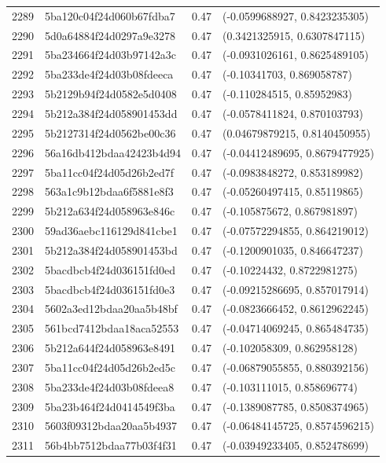 \begin{table}[ht]
\begin{tabular}{rlrl}
  2289 & 5ba120c04f24d060b67fdba7 & 0.47 & (-0.0599688927, 0.8423235305) \\ 
  2290 & 5d0a64884f24d0297a9e3278 & 0.47 & (0.3421325915, 0.6307847115) \\ 
  2291 & 5ba234664f24d03b97142a3c & 0.47 & (-0.0931026161, 0.8625489105) \\ 
  2292 & 5ba233de4f24d03b08fdeeca & 0.47 & (-0.10341703, 0.869058787) \\ 
  2293 & 5b2129b94f24d0582e5d0408 & 0.47 & (-0.110284515, 0.85952983) \\ 
  2294 & 5b212a384f24d058901453dd & 0.47 & (-0.0578411824, 0.870103793) \\ 
  2295 & 5b2127314f24d0562be00c36 & 0.47 & (0.04679879215, 0.8140450955) \\ 
  2296 & 56a16db412bdaa42423b4d94 & 0.47 & (-0.04412489695, 0.8679477925) \\ 
  2297 & 5ba11cc04f24d05d26b2ed7f & 0.47 & (-0.0983848272, 0.853189982) \\ 
  2298 & 563a1c9b12bdaa6f5881e8f3 & 0.47 & (-0.05260497415, 0.85119865) \\ 
  2299 & 5b212a634f24d058963e846c & 0.47 & (-0.105875672, 0.867981897) \\ 
  2300 & 59ad36aebc116129d841cbe1 & 0.47 & (-0.07572294855, 0.864219012) \\ 
  2301 & 5b212a384f24d058901453bd & 0.47 & (-0.1200901035, 0.846647237) \\ 
  2302 & 5bacdbcb4f24d036151fd0ed & 0.47 & (-0.10224432, 0.8722981275) \\ 
  2303 & 5bacdbcb4f24d036151fd0e3 & 0.47 & (-0.09215286695, 0.857017914) \\ 
  2304 & 5602a3ed12bdaa20aa5b48bf & 0.47 & (-0.0823666452, 0.8612962245) \\ 
  2305 & 561bcd7412bdaa18aca52553 & 0.47 & (-0.04714069245, 0.865484735) \\ 
  2306 & 5b212a644f24d058963e8491 & 0.47 & (-0.102058309, 0.862958128) \\ 
  2307 & 5ba11cc04f24d05d26b2ed5c & 0.47 & (-0.06879055855, 0.880392156) \\ 
  2308 & 5ba233de4f24d03b08fdeea8 & 0.47 & (-0.103111015, 0.858696774) \\ 
  2309 & 5ba23b464f24d0414549f3ba & 0.47 & (-0.1389087785, 0.8508374965) \\ 
  2310 & 5603f09312bdaa20aa5b4937 & 0.47 & (-0.06484145725, 0.8574596215) \\ 
  2311 & 56b4bb7512bdaa77b03f4f31 & 0.47 & (-0.03949233405, 0.852478699) \\ 

\end{tabular}
\end{table}
